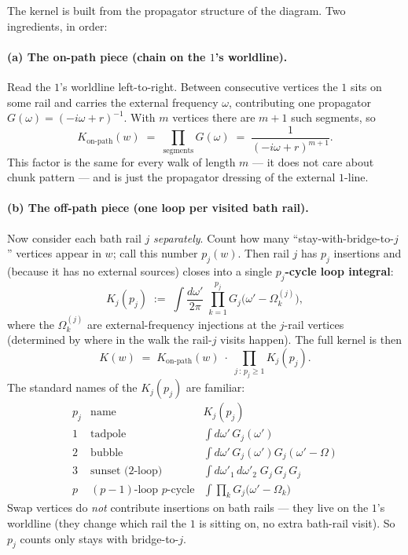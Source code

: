 \documentclass[11pt,a4paper]{article}
\begin{document}
The kernel is built from the propagator structure of the diagram. Two
ingredients, in order:

\paragraph{(a) The on-path piece (chain on the $1$'s worldline).}
Read the $1$'s worldline left-to-right. Between consecutive vertices
the $1$ sits on some rail and carries the external frequency $\omega$,
contributing one propagator $G(\omega) = (-i\omega+r)^{-1}$. With $m$
vertices there are $m{+}1$ such segments, so
\begin{equation}\label{eq:on-path}
K_{\text{on-path}}(w) \;=\; \prod_{\text{segments}}G(\omega)
\;=\; \frac{1}{(-i\omega+r)^{m+1}}.
\end{equation}
This factor is the same for every walk of length $m$ --- it does not
care about chunk pattern --- and is just the propagator dressing of the
external $1$-line.

\paragraph{(b) The off-path piece (one loop per visited bath rail).}
Now consider each bath rail $j$ \emph{separately}. Count how many
``stay-with-bridge-to-$j$'' vertices appear in $w$; call this number
$p_{j}(w)$. Then rail $j$ has $p_{j}$ insertions and (because it has
no external sources) closes into a single \textbf{$p_{j}$-cycle loop
integral}:
\begin{equation}\label{eq:off-path}
K_{j}(p_{j}) \;:=\;
\int\!\frac{d\omega'}{2\pi}\;\prod_{k=1}^{p_{j}}
G_{j}\!\big(\omega' - \Omega^{(j)}_{k}\big),
\end{equation}
where the $\Omega^{(j)}_{k}$ are external-frequency injections at the
$j$-rail vertices (determined by where in the walk the rail-$j$ visits
happen). The full kernel is then
\begin{equation}\label{eq:total-kernel}
K(w) \;=\; K_{\text{on-path}}(w)\;\cdot\;\prod_{j\,:\,p_{j}\geq 1}
K_{j}(p_{j}).
\end{equation}
The standard names of the $K_{j}(p_{j})$ are familiar:
\[
\renewcommand{\arraystretch}{1.2}
\begin{array}{c|l|l}
p_{j} & \text{name} & K_{j}(p_{j}) \\ \hline
1 & \text{tadpole} & \int\!d\omega'\,G_{j}(\omega') \\
2 & \text{bubble} & \int\!d\omega'\,G_{j}(\omega')G_{j}(\omega'{-}\Omega) \\
3 & \text{sunset (2-loop)} & \int\!d\omega'_{1}\,d\omega'_{2}\;G_{j}\,G_{j}\,G_{j} \\
p & (p{-}1)\text{-loop }p\text{-cycle} &
\int\prod_{k}G_{j}\big(\omega'-\Omega_{k}\big)
\end{array}
\]
Swap vertices do \emph{not} contribute insertions on bath rails ---
they live on the $1$'s worldline (they change which rail the $1$ is
sitting on, no extra bath-rail visit). So $p_{j}$ counts only stays
with bridge-to-$j$.
\end{document}
